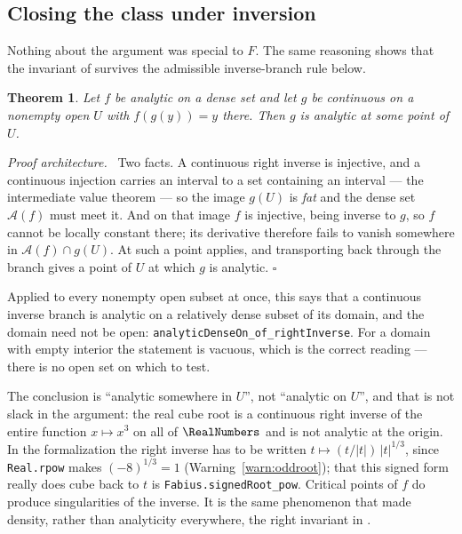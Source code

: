 \documentclass[11pt,oneside]{article}
\newtheorem{theorem}{Theorem}[section]
\theoremstyle{definition}
\theoremstyle{remark}
\newcommand{\An}{\mathcal A}
\newenvironment{proofidea}{\par\smallskip\noindent\textit{Proof architecture.}\ }{\hfill$\square$\par\smallskip}
\begin{document}
\subsection{Closing the class under inversion}

Nothing about the argument was special to $F$.  The same reasoning shows that
the invariant of  survives the admissible inverse-branch rule
below.

\begin{theorem}\label{thm:invbranch}
Let $f$ be analytic on a dense set and let $g$ be continuous on a nonempty
open $U$ with $f(g(y))=y$ there.  Then $g$ is analytic at some point of $U$.
\end{theorem}

\begin{proofidea}
Two facts.  A continuous right inverse is injective, and a continuous
injection carries an interval to a set containing an interval --- the
intermediate value theorem --- so the image $g(U)$ is \emph{fat} and the dense
set $\An(f)$ must meet it.  And on that image $f$ is injective, being inverse
to $g$, so $f$ cannot be locally constant there; its derivative therefore
fails to vanish somewhere in $\An(f)\cap g(U)$.  At such a point
 applies, and transporting back through the branch gives a point
of $U$ at which $g$ is analytic.
\end{proofidea}

Applied to every nonempty open subset at once, this says that a continuous
inverse branch is analytic on a relatively dense subset of its domain, and the
domain need not be open: \texttt{analyticDenseOn\_of\_rightInverse}.  For a
domain with empty interior the statement is vacuous, which is the correct
reading --- there is no open set on which to test.

The conclusion is ``analytic somewhere in $U$'', not ``analytic on $U$'', and
that is not slack in the argument: the real cube root is a continuous right
inverse of the entire function $x\mapsto x^3$ on all of $\RealNumbers$ and is not
analytic at the origin.  In the formalization the right inverse has to be
written $t\mapsto(t/|t|)\,|t|^{1/3}$, since \texttt{Real.rpow} makes
$(-8)^{1/3}=1$ (Warning~\ref{warn:oddroot}); that this signed form really does
cube back to $t$ is \texttt{Fabius.signedRoot\_pow}.  Critical points of $f$
do produce singularities of the inverse.  It is the same phenomenon that made
density, rather than analyticity everywhere, the right invariant in
.
\end{document}
